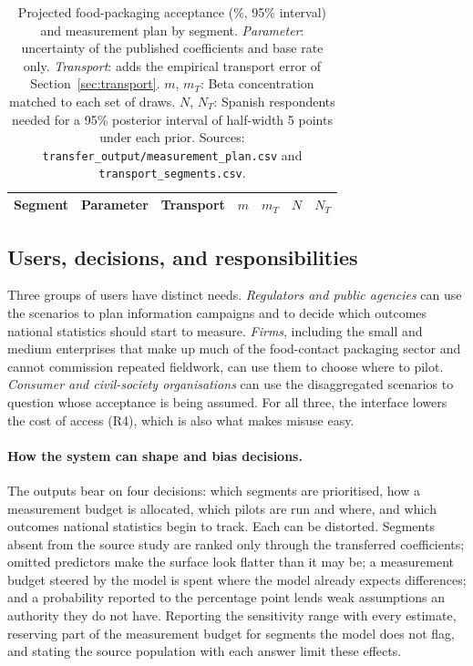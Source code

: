 \begin{table}[htbp]
\centering
\caption{Projected food-packaging acceptance (\%, 95\% interval) and
measurement plan by segment. \emph{Parameter}: uncertainty of the published
coefficients and base rate only. \emph{Transport}: adds the empirical
transport error of Section~\ref{sec:transport}. $m$, $m_T$: Beta concentration
matched to each set of draws. $N$, $N_T$: Spanish respondents needed for a
95\% posterior interval of half-width 5 points under each prior. Sources:
\texttt{transfer\_output/measurement\_plan.csv} and
\texttt{transport\_segments.csv}.}
\label{tab:plan}
\small
\setlength{\tabcolsep}{4pt}
\begin{tabular}{lrrrrrr}
\toprule
\textbf{Segment} & \textbf{Parameter} & \textbf{Transport} & $m$ & $m_T$ & $N$ & $N_T$ \\
\midrule
\bottomrule
\end{tabular}
\end{table}

\subsection{Users, decisions, and responsibilities}

Three groups of users have distinct needs. \emph{Regulators and public
agencies} can use the scenarios to plan information campaigns and to decide
which outcomes national statistics should start to measure. \emph{Firms},
including the small and medium enterprises that make up much of the
food-contact packaging sector and cannot commission repeated fieldwork, can use
them to choose where to pilot. \emph{Consumer and civil-society organisations}
can use the disaggregated scenarios to question whose acceptance is being
assumed. For all three, the interface lowers the cost of access (R4), which is
also what makes misuse easy.

\paragraph{How the system can shape and bias decisions.}
The outputs bear on four decisions: which segments are prioritised, how a
measurement budget is allocated, which pilots are run and where, and which
outcomes national statistics begin to track. Each can be distorted. Segments
absent from the source study are ranked only through the transferred
coefficients; omitted predictors make the surface look flatter than it may be;
a measurement budget steered by the model is spent where the model already
expects differences; and a probability reported to the percentage point lends
weak assumptions an authority they do not have. Reporting the sensitivity range
with every estimate, reserving part of the measurement budget for segments the
model does not flag, and stating the source population with each answer limit
these effects.

